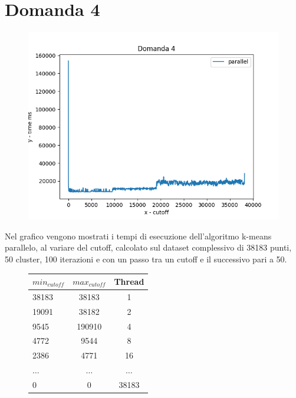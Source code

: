 \documentclass{article}
\begin{document}
\section*{Domanda 4}
\begin{center}
	\begin{figure}[H]
		\includegraphics[width=1\linewidth, valign=t]{figures/domanda4}
	\end{figure}
					
\end{center}

\noindent Nel grafico vengono mostrati i tempi di esecuzione dell'algoritmo k-means parallelo, al variare del cutoff, calcolato sul dataset complessivo di 38183 punti, 50 cluster, 100 iterazioni e con un passo tra un cutoff e il successivo pari a 50.\\ 
							
\newpage	
\begin{figure}
	\vspace*{-0.5cm}
	\centering
	\begin{tabular}{lcc}
		\toprule
		$min_{cutoff}$ & $max_{cutoff}$ & Thread  \\
		\midrule
		38183          & 38183          & 1       \\
		19091          & 38182          & 2       \\
		9545           & 190910         & 4       \\
		4772           & 9544           & 8       \\
		2386           & 4771           & 16      \\
		$\dots$        & $\dots$        & $\dots$ \\
		0              & 0              & 38183   \\			
		\bottomrule
	\end{tabular}
\end{figure}
\end{document}
